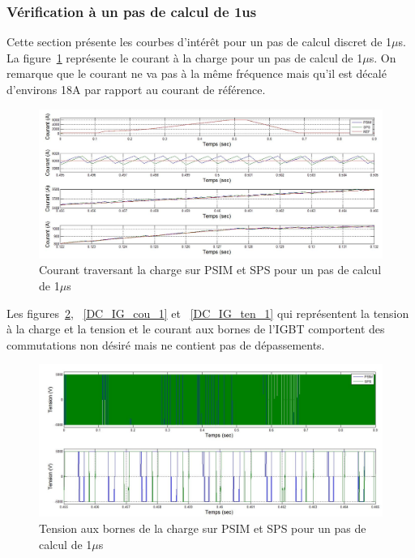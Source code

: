 \documentclass[11pt,letterpaper,final]{report}
\begin{document}
\clearpage
\subsubsection{Vérification à un pas de calcul de 1us}
Cette section présente les courbes d'intérêt pour un pas de calcul discret de 1$\mu$s. La figure~\ref{DC_ch_cou_1} représente le courant à la charge pour un pas de calcul de 1$\mu$s. On remarque que le courant ne va pas à la même fréquence mais qu'il est décalé d'environs 18A par rapport au courant de référence.



\begin{figure}[htb]
\centering
\includegraphics[scale=0.5]{Fig/DCPDCN/DCPCourantCharge1u.jpg}
\caption{Courant traversant la charge sur PSIM et SPS pour un pas de calcul de 1$\mu$s}
\label{DC_ch_cou_1}
\end{figure}

Les figures~\ref{DC_ch_ten_1}, ~\ref{DC_IG_cou_1} et ~\ref{DC_IG_ten_1} qui représentent la tension à la charge et la tension et le courant aux bornes de l'IGBT comportent des commutations non désiré mais ne contient pas de dépassements.

\begin{figure}[htb]
\centering
\includegraphics[scale=0.5]{Fig/DCPDCN/DCPTensionCharge1u.jpg}
\caption{Tension aux bornes de la charge sur PSIM et SPS pour un pas de calcul de 1$\mu$s}
\label{DC_ch_ten_1}
\end{figure}
\end{document}
